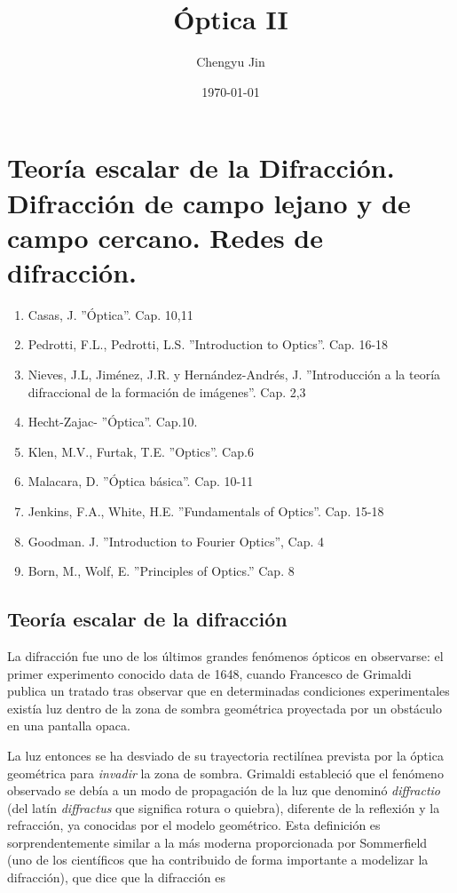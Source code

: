 \documentclass[12pt,a4paper]{report}
\title{Óptica II}
\author{Chengyu Jin}
\date{\today}
\newcommand{\esp}{\vspace{0.5cm}}
\begin{document}
	
	\maketitle
	
	\tableofcontents
	\newpage
	
	\chapter{Teoría escalar de la Difracción. Difracción de campo lejano y de campo cercano. Redes de difracción.}
	
	\begin{bibliografia}
		\begin{enumerate}
			\item Casas, J. ''Óptica''. Cap. 10,11
			\item Pedrotti, F.L., Pedrotti, L.S. ''Introduction to Optics''. Cap. 16-18
			\item Nieves, J.L, Jiménez, J.R. y Hernández-Andrés, J. ''Introducción a la teoría difraccional de la formación de imágenes''. Cap. 2,3
			\item Hecht-Zajac- ''Óptica''. Cap.10.
			\item Klen, M.V., Furtak, T.E. ''Optics''. Cap.6
			\item Malacara, D. ''Óptica básica''. Cap. 10-11
			\item Jenkins, F.A., White, H.E. ''Fundamentals of Optics''. Cap. 15-18
			\item Goodman. J. ''Introduction to Fourier Optics'', Cap. 4
			\item Born, M., Wolf, E. ''Principles of Optics.'' Cap. 8
		\end{enumerate}
	\end{bibliografia}
	
	\section{Teoría escalar de la difracción}
	
	La difracción fue uno de los últimos grandes fenómenos ópticos en observarse: el primer experimento conocido data de 1648, cuando Francesco de Grimaldi publica un tratado tras observar que en determinadas condiciones experimentales existía luz dentro de la zona de sombra geométrica proyectada por un obstáculo en una pantalla opaca.
	
	\esp
	
	La luz entonces se ha desviado de su trayectoria rectilínea prevista por la óptica geométrica para \textit{invadir} la zona de sombra. Grimaldi estableció que el fenómeno observado se debía a un modo de propagación de la luz que denominó \textit{diffractio} (del latín \textit{diffractus} que significa rotura o quiebra), diferente de la reflexión y la refracción, ya conocidas por el modelo geométrico. Esta definición es sorprendentemente similar a la más moderna proporcionada por Sommerfield (uno de los científicos que ha contribuido de forma importante a modelizar la difracción), que dice que la difracción es
	
\end{document}

